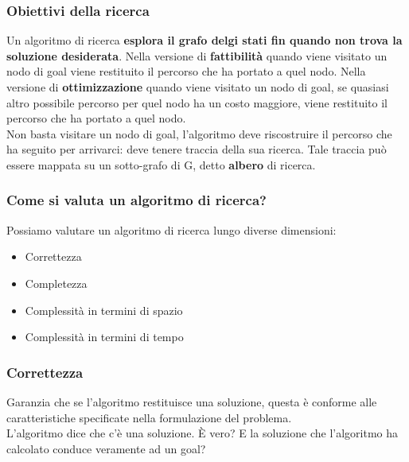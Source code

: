 \documentclass{article}
\begin{document}
\subsubsection{Obiettivi della ricerca}
Un algoritmo di ricerca \textbf{esplora il grafo delgi stati fin quando non trova la soluzione desiderata}. Nella versione di \textbf{fattibilità} quando viene visitato un nodo di goal viene restituito il percorso che ha portato a quel nodo. Nella versione di \textbf{ottimizzazione} quando viene visitato un nodo di goal, se quasiasi altro possibile percorso per quel nodo ha un costo maggiore, viene restituito il percorso che ha portato a quel nodo. \\ Non basta visitare un nodo di goal, l'algoritmo deve riscostruire il percorso che ha seguito per arrivarci: deve tenere traccia della sua ricerca. Tale traccia può essere mappata su un sotto-grafo di G, detto \textbf{albero} di ricerca.

\subsubsection{Come si valuta un algoritmo di ricerca?}
Possiamo valutare un algoritmo di ricerca lungo diverse dimensioni:
\begin{itemize}
    \item Correttezza
    \item Completezza
    \item Complessità in termini di spazio
    \item Complessità in termini di tempo
\end{itemize}
\subsubsection{Correttezza}
Garanzia che se l'algoritmo restituisce una soluzione, questa è conforme alle caratteristiche specificate nella formulazione del problema. \\ L'algoritmo dice che c'è una soluzione. È vero? E la soluzione che l'algoritmo ha calcolato conduce veramente ad un goal?
\end{document}
